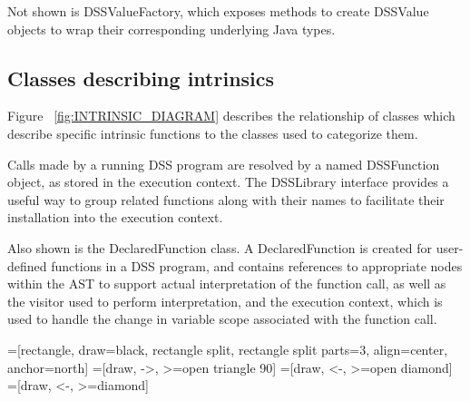\documentclass[12pt,letterpaper]{article}
\begin{document}
{Not shown is DSSValueFactory, which exposes methods to create DSSValue 
objects to wrap their corresponding underlying Java types.

\subsection{Classes describing intrinsics}

Figure ~\ref{fig:INTRINSIC_DIAGRAM} describes the relationship of classes 
which describe specific intrinsic functions to the classes used to 
categorize them.

Calls made by a running DSS program are resolved by a named DSSFunction 
object, as stored in the execution context. The DSSLibrary interface 
provides a useful way to group related functions along with their names 
to facilitate their installation into the execution context. 

Also shown is the DeclaredFunction class. A DeclaredFunction is created 
for user-defined functions in a DSS program, and contains references to 
appropriate nodes within the AST to support actual interpretation of the 
function call, as well as the visitor used to perform interpretation, and 
the execution context, which is used to handle the change in variable 
scope associated with the function call.

=[rectangle, 
                   draw=black, 
                   rectangle split, 
                   rectangle split parts=3,
                   align=center,
                   anchor=north]
=[draw, ->, >=open triangle 90]
=[draw, <-, >=open diamond]
=[draw, <-, >=diamond]

\begin{figure}
\begin{center}
\end{center}
\end{figure}}
\end{document}

